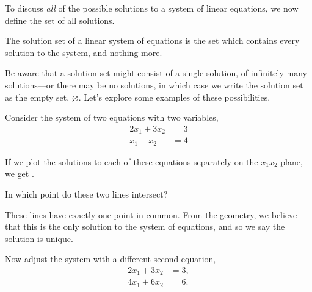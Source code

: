 \documentclass{ximera}
\begin{document}
To discuss \textit{all} of the possible solutions to a system of linear equations, we now define the set of all solutions.

\begin{definition}
  The solution set of a linear system of equations is the set which contains every solution to the system, and nothing more.
\end{definition}

\begin{problem}
  Be aware that a solution set might consist of a single solution, of infinitely many solutions---or there may be no solutions, in which case we write the solution set as the empty set, $\varnothing$.  Let's explore some examples of these possibilities.
  
  \begin{example}
    Consider the system of two equations with two variables,
    \begin{align*}
      2x_1+3x_2&=3\\
      x_1-x_2&=4
    \end{align*}
    
    \begin{question}
      If we plot the solutions to each of these equations separately on the
      $x_{1}x_{2}$-plane, we get .
      
      \begin{question}
        In which point do these two lines intersect?
        \begin{multipleChoice}
        \end{multipleChoice}
        
        \begin{feedback}
          These lines have exactly one point in common.  From the geometry, we believe that this is the only solution to the system of equations, and so we say the solution is unique.
        \end{feedback}
      \end{question}
    \end{question}

  \end{example}

  \begin{example}
    Now adjust the system with a different second equation,
    \begin{align*}
      2x_1+3x_2&=3,\\
      4x_1+6x_2&=6.
    \end{align*}


\end{example}
\end{problem}
\end{document}
